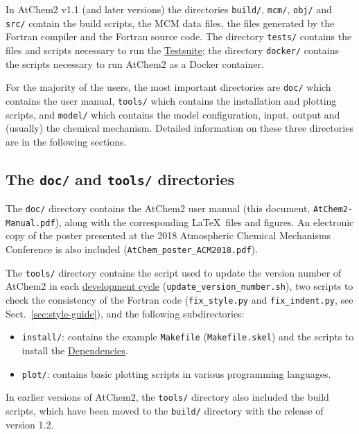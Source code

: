 In AtChem2 v1.1 (and later versions) the directories \texttt{build/},
\texttt{mcm/}, \texttt{obj/} and \texttt{src/} contain the build
scripts, the MCM data files, the files generated by the Fortran
compiler and the Fortran source code. The directory \texttt{tests/}
contains the files and scripts necessary to run the
\hyperref[sec:test-suite]{Testsuite}; the directory \texttt{docker/}
contains the scripts necessary to run AtChem2 as a Docker container.

For the majority of the users, the most important directories are
\texttt{doc/} which contains the user manual, \texttt{tools/} which
contains the installation and plotting scripts, and \texttt{model/}
which contains the model configuration, input, output and (usually)
the chemical mechanism. Detailed information on these three
directories are in the following sections.

\subsection{The \texttt{doc/} and \texttt{tools/} directories} \label{subsec:doc-tools-directories}

The \texttt{doc/} directory contains the AtChem2 user manual (this
document, \texttt{AtChem2-Manual.pdf}), along with the corresponding
\LaTeX\ files and figures. An electronic copy of the poster presented
at the 2018 Atmospheric Chemical Mechanisms Conference \citep{sommariva_2018}
is also included (\texttt{AtChem\_poster\_ACM2018.pdf}).

The \texttt{tools/} directory contains the script used to update the version
number of AtChem2 in each \hyperref[ch:development]{development cycle}
(\texttt{update\_version\_number.sh}), two scripts to check the
consistency of the Fortran code (\texttt{fix\_style.py} and
\texttt{fix\_indent.py}, see Sect.~\ref{sec:style-guide}), and the
following subdirectories:

\begin{itemize}
\item \texttt{install/}: contains the example \texttt{Makefile}
  (\texttt{Makefile.skel}) and the scripts to install the
  \hyperref[sec:dependencies]{Dependencies}.
\item \texttt{plot/}: contains basic plotting scripts in various
  programming languages.
\end{itemize}

In earlier versions of AtChem2, the \texttt{tools/} directory also
included the build scripts, which have been moved to the
\texttt{build/} directory with the release of version 1.2.

